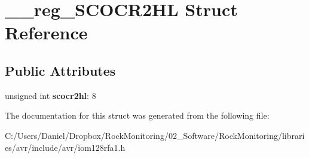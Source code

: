 \hypertarget{struct____reg___s_c_o_c_r2_h_l}{}\section{\+\_\+\+\_\+reg\+\_\+\+S\+C\+O\+C\+R2\+HL Struct Reference}
\label{struct____reg___s_c_o_c_r2_h_l}
\subsection*{Public Attributes}
\begin{DoxyCompactItemize}
\item 
unsigned int {\bfseries scocr2hl}\+: 8\hypertarget{struct____reg___s_c_o_c_r2_h_l_a32e484ddebed2576f2ef67fb2a015ced}{}\label{struct____reg___s_c_o_c_r2_h_l_a32e484ddebed2576f2ef67fb2a015ced}

\end{DoxyCompactItemize}


The documentation for this struct was generated from the following file\+:\begin{DoxyCompactItemize}
\item 
C\+:/\+Users/\+Daniel/\+Dropbox/\+Rock\+Monitoring/02\+\_\+\+Software/\+Rock\+Monitoring/libraries/avr/include/avr/iom128rfa1.\+h\end{DoxyCompactItemize}
